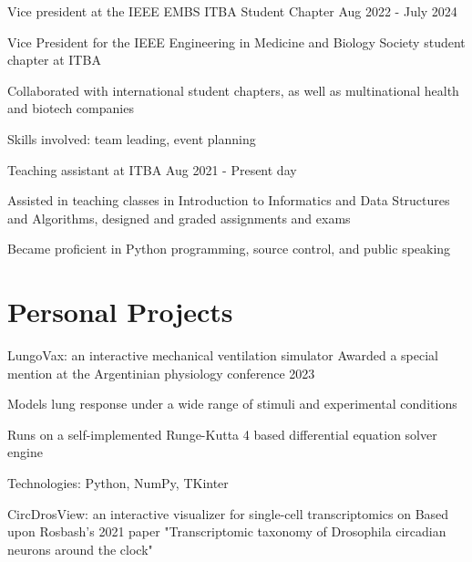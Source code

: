 \documentclass{resume}
\begin{document}
    \resumeSubheading
    {Vice president at the IEEE EMBS ITBA Student Chapter}{}
    {}{Aug 2022 - July 2024}
    \vspace{-5mm}
    \resumeItemListStart
    \item{Vice President for the IEEE Engineering in Medicine and Biology Society student chapter at ITBA}
    \item{Collaborated with international student chapters,
        as well as multinational health and biotech companies}
    \item {Skills involved: team leading, event planning}
    \resumeItemListEnd


    \resumeSubheading
    {Teaching assistant at ITBA}{}
    {}{Aug 2021 - Present day}
    \vspace{-5mm}
    \resumeItemListStart
    \item
    {Assisted in teaching classes in Introduction to Informatics and Data Structures and Algorithms,
        designed and graded assignments and exams}
    \item {Became proficient in Python programming, source control, and public speaking}
    \resumeItemListEnd
    \resumeSubHeadingListEnd

    \vspace{-5mm}


    \section{\textbf{Personal Projects}} \label{sec:projects}
    \resumeSubHeadingListStart
    \resumeProject
    {LungoVax: an interactive mechanical ventilation simulator} %
    {Awarded a special mention at the Argentinian physiology conference 2023} %
    {} %

    \resumeItemListStart
    \item {Models lung response under a wide range of stimuli and experimental conditions}
    \item {Runs on a self-implemented Runge-Kutta 4 based differential equation solver engine}
    \item {Technologies: Python, NumPy, TKinter}
    \resumeItemListEnd

    \resumeProject
    {CircDrosView: an interactive visualizer for single-cell transcriptomics on }
    {Based upon Rosbash's 2021 paper
    "Transcriptomic taxonomy of Drosophila circadian neurons around the clock"}
    {} %
\end{document}
